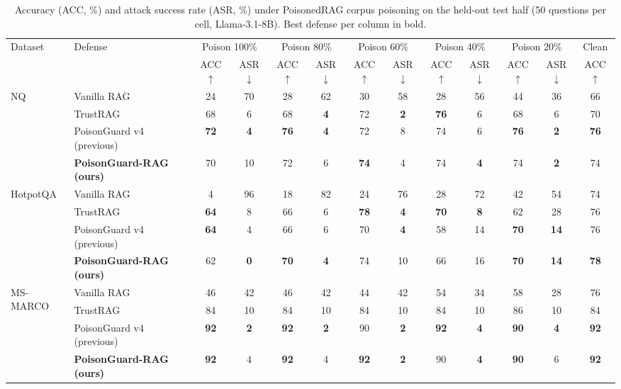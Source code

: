 \begin{table}[t]\centering\small
\caption{Accuracy (ACC, \%) and attack success rate (ASR, \%) under PoisonedRAG corpus poisoning on the held-out test half (50 questions per cell, Llama-3.1-8B). Best defense per column in bold.}\label{tab:main}
\begin{tabular}{llccccccccccc}\toprule
Dataset & Defense & \multicolumn{2}{c}{Poison 100\%} & \multicolumn{2}{c}{Poison 80\%} & \multicolumn{2}{c}{Poison 60\%} & \multicolumn{2}{c}{Poison 40\%} & \multicolumn{2}{c}{Poison 20\%} & Clean \\
 & & ACC$\uparrow$ & ASR$\downarrow$ & ACC$\uparrow$ & ASR$\downarrow$ & ACC$\uparrow$ & ASR$\downarrow$ & ACC$\uparrow$ & ASR$\downarrow$ & ACC$\uparrow$ & ASR$\downarrow$ & ACC$\uparrow$ \\\midrule
\multirow{4}{*}{NQ} & Vanilla RAG & 24 & 70 & 28 & 62 & 30 & 58 & 28 & 56 & 44 & 36 & 66 \\
 & TrustRAG & 68 & 6 & 68 & \textbf{4} & 72 & \textbf{2} & \textbf{76} & 6 & 68 & 6 & 70 \\
 & PoisonGuard v4 (previous) & \textbf{72} & \textbf{4} & \textbf{76} & \textbf{4} & 72 & 8 & 74 & 6 & \textbf{76} & \textbf{2} & \textbf{76} \\
 & \textbf{PoisonGuard-RAG (ours)} & 70 & 10 & 72 & 6 & \textbf{74} & 4 & 74 & \textbf{4} & 74 & \textbf{2} & 74 \\
\midrule
\multirow{4}{*}{HotpotQA} & Vanilla RAG & 4 & 96 & 18 & 82 & 24 & 76 & 28 & 72 & 42 & 54 & 74 \\
 & TrustRAG & \textbf{64} & 8 & 66 & 6 & \textbf{78} & \textbf{4} & \textbf{70} & \textbf{8} & 62 & 28 & 76 \\
 & PoisonGuard v4 (previous) & \textbf{64} & 4 & 66 & 6 & 70 & \textbf{4} & 58 & 14 & \textbf{70} & \textbf{14} & 76 \\
 & \textbf{PoisonGuard-RAG (ours)} & 62 & \textbf{0} & \textbf{70} & \textbf{4} & 74 & 10 & 66 & 16 & \textbf{70} & \textbf{14} & \textbf{78} \\
\midrule
\multirow{4}{*}{MS-MARCO} & Vanilla RAG & 46 & 42 & 46 & 42 & 44 & 42 & 54 & 34 & 58 & 28 & 76 \\
 & TrustRAG & 84 & 10 & 84 & 10 & 84 & 10 & 84 & 10 & 86 & 10 & 84 \\
 & PoisonGuard v4 (previous) & \textbf{92} & \textbf{2} & \textbf{92} & \textbf{2} & 90 & \textbf{2} & \textbf{92} & \textbf{4} & \textbf{90} & \textbf{4} & \textbf{92} \\
 & \textbf{PoisonGuard-RAG (ours)} & \textbf{92} & 4 & \textbf{92} & 4 & \textbf{92} & \textbf{2} & 90 & \textbf{4} & \textbf{90} & 6 & \textbf{92} \\
\bottomrule
\end{tabular}\end{table}

